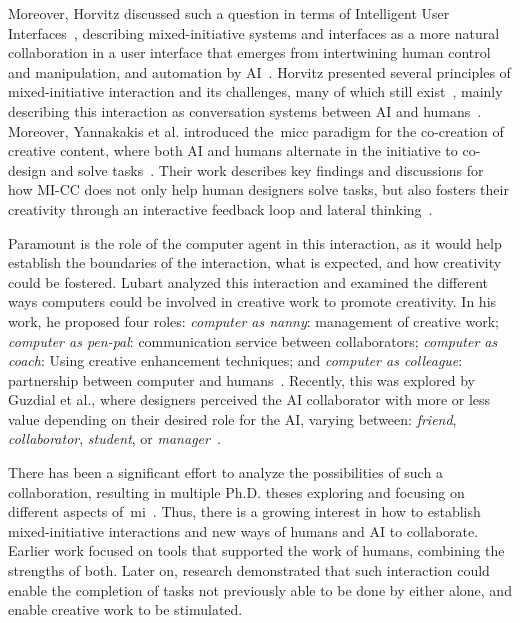 Moreover, Horvitz discussed such a question in terms of Intelligent User Interfaces~\cite{Birnbaum97-IUI}, describing mixed-initiative systems and interfaces as a more natural collaboration in a user interface that emerges from intertwining human control and manipulation, and automation by AI~\cite{Horvitz99-uncertainty}. Horvitz presented several principles of mixed-initiative interaction and its challenges, many of which still exist~\cite{Horvitz99-mixedInit}, mainly describing this interaction as conversation systems between AI and humans~\cite{horvitz1999-conversationModel}. Moreover, Yannakakis et al. introduced the~\acrfull{micc} paradigm for the co-creation of creative content, where both AI and humans alternate in the initiative to co-design and solve tasks~\cite{yannakakis2014micc}. Their work describes key findings and discussions for how MI-CC does not only help human designers solve tasks, but also fosters their creativity through an interactive feedback loop and lateral thinking~\cite{Liapis2016-CanComputersFosterCreativity,Liapis2014-gameCreativity,Alvarez2018}. 

Paramount is the role of the computer agent in this interaction, as it would help establish the boundaries of the interaction, what is expected, and how creativity could be fostered. Lubart analyzed this interaction and examined the different ways computers could be involved in creative work to promote creativity. In his work, he proposed four roles: \emph{computer as nanny}: management of creative work; \emph{computer as pen-pal}: communication service between collaborators; \emph{computer as coach}: Using creative enhancement techniques; and \emph{computer as colleague}: partnership between computer and humans~\cite{LUBART2005-computerPartners}. Recently, this was explored by Guzdial et al., where designers perceived the AI collaborator with more or less value depending on their desired role for the AI, varying between: \emph{friend}, \emph{collaborator}, \emph{student}, or \emph{manager}~\cite{Guzdial2019-AISystemDesign-Creators}.

There has been a significant effort to analyze the possibilities of such a collaboration, resulting in multiple Ph.D. theses exploring and focusing on different aspects of~\acrshort{mi}~\cite{SmithPhD,LiapisPhD,ComptonPhD,GuzdialPhD,MachadoPhD}. Thus, there is a growing interest in how to establish mixed-initiative interactions and new ways of humans and AI to collaborate. Earlier work focused on tools that supported the work of humans, combining the strengths of both. Later on, research demonstrated that such interaction could enable the completion of tasks not previously able to be done by either alone, and enable creative work to be stimulated. 


